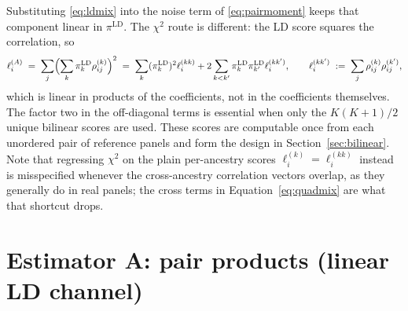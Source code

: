 \documentclass[11pt,a4paper]{article}
\newcommand{\Rho}{\rho}
\begin{document}
Substituting \eqref{eq:ldmix} into the noise term of
\eqref{eq:pairmoment} keeps that component linear in
$\pi^{\mathrm{LD}}$. The $\chi^2$ route is different: the LD score squares
the correlation, so
\begin{equation}\label{eq:quadmix}
  \ell^{(A)}_i
  \;=\; \sum_j \Bigl( \sum_k \pi^{\mathrm{LD}}_k
                         \Rho^{(k)}_{ij} \Bigr)^{2}
  \;=\; \sum_k (\pi^{\mathrm{LD}}_k)^2\ell^{(kk)}_i
       + 2\sum_{k<k'}\pi^{\mathrm{LD}}_k\pi^{\mathrm{LD}}_{k'}
         \ell^{(kk')}_i,
  \qquad
  \ell^{(kk')}_i \;:=\; \sum_j \Rho^{(k)}_{ij} \Rho^{(k')}_{ij},
\end{equation}
which is linear in products of the coefficients, not in the coefficients
themselves. The factor two in the off-diagonal terms is essential when only
the $K(K+1)/2$ unique bilinear scores are used. These scores are computable
once from each unordered pair of reference panels and form the design in
Section~\ref{sec:bilinear}. Note that regressing $\chi^2$ on the plain
per-ancestry scores $\ell^{(k)}_i = \ell^{(kk)}_i$ instead is misspecified
whenever the cross-ancestry correlation vectors overlap, as they generally
do in real panels; the cross terms in Equation~\eqref{eq:quadmix} are what
that shortcut drops.

\section{Estimator A: pair products (linear LD channel)}\label{sec:pairwise}
\end{document}
